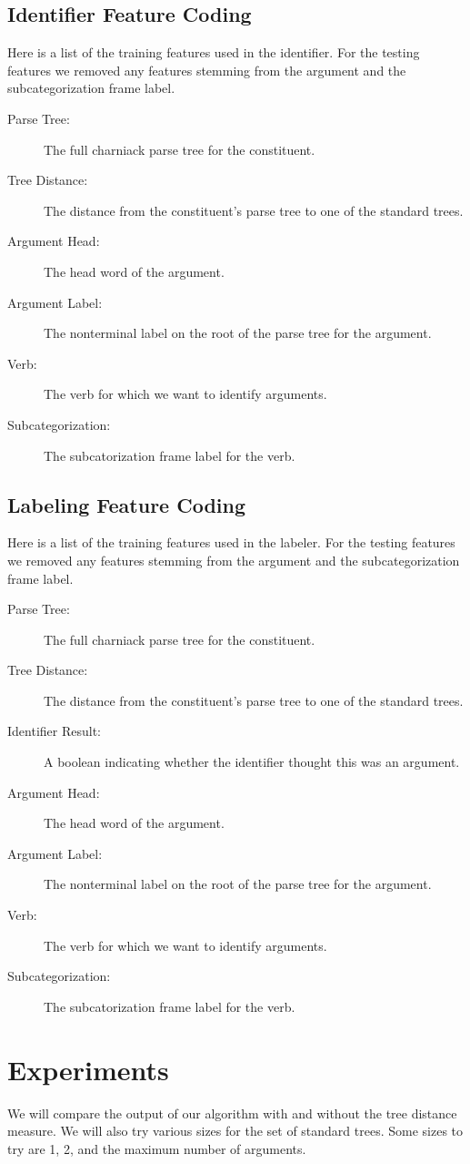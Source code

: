 \documentclass{article}
\begin{document}
\subsection{Identifier Feature Coding}
Here is a list of the training features used in the identifier.  For the 
testing features we removed any features stemming from the argument and 
the subcategorization frame label.

\begin{description}
\item[Parse Tree:] The full charniack parse tree for the constituent.
\item[Tree Distance:] The distance from the constituent's parse tree to 
                      one of the standard trees.
\item[Argument Head:] The head word of the argument.
\item[Argument Label:] The nonterminal label on the root of the parse tree
                       for the argument.
\item[Verb:] The verb for which we want to identify arguments.
\item[Subcategorization:] The subcatorization frame label for the verb.
\end{description}

\subsection{Labeling Feature Coding}
Here is a list of the training features used in the labeler.  For the 
testing features we removed any features stemming from the argument and 
the subcategorization frame label.

\begin{description}
\item[Parse Tree:] The full charniack parse tree for the constituent.
\item[Tree Distance:] The distance from the constituent's parse tree to 
                      one of the standard trees.
\item[Identifier Result:] A boolean indicating whether the identifier thought
                          this was an argument.
\item[Argument Head:] The head word of the argument.
\item[Argument Label:] The nonterminal label on the root of the parse tree
                       for the argument.
\item[Verb:] The verb for which we want to identify arguments.
\item[Subcategorization:] The subcatorization frame label for the verb.
\end{description}

\section{Experiments}
We will compare the output of our algorithm with and without the tree
distance measure.  We will also try various sizes for the set of standard
trees.  Some sizes to try are 1, 2, and the maximum number of arguments.
\end{document}

